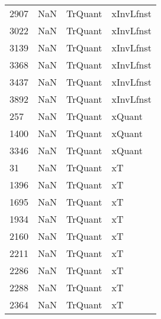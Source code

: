 \begin{tabular}{llll}
2907 &                   NaN &                    TrQuant &                                 xInvLfnst \\
3022 &                   NaN &                    TrQuant &                                 xInvLfnst \\
3139 &                   NaN &                    TrQuant &                                 xInvLfnst \\
3368 &                   NaN &                    TrQuant &                                 xInvLfnst \\
3437 &                   NaN &                    TrQuant &                                 xInvLfnst \\
3892 &                   NaN &                    TrQuant &                                 xInvLfnst \\
257  &                   NaN &                    TrQuant &                                    xQuant \\
1400 &                   NaN &                    TrQuant &                                    xQuant \\
3346 &                   NaN &                    TrQuant &                                    xQuant \\
31   &                   NaN &                    TrQuant &                                        xT \\
1396 &                   NaN &                    TrQuant &                                        xT \\
1695 &                   NaN &                    TrQuant &                                        xT \\
1934 &                   NaN &                    TrQuant &                                        xT \\
2160 &                   NaN &                    TrQuant &                                        xT \\
2211 &                   NaN &                    TrQuant &                                        xT \\
2286 &                   NaN &                    TrQuant &                                        xT \\
2288 &                   NaN &                    TrQuant &                                        xT \\
2364 &                   NaN &                    TrQuant &                                        xT \\

\end{tabular}
